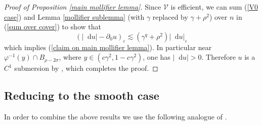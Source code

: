 \documentclass[reqno,11pt]{amsart}
\newcommand*\dif{\mathop{}\!\mathrm{d}}
\theoremstyle{definition}
\numberwithin{equation}{section}
\begin{document}
\begin{proof}[Proof of Proposition \ref{main mollifier lemma}]
Since $\mathcal V$ is efficient, we can sum (\ref{V0 case}) and Lemma \ref{mollifier sublemma} (with $\gamma$ replaced by $\gamma + \rho^2$) over $n$ in (\ref{sum over cover}) to show that
$$(|\dif u| - \partial_0 u)_\varepsilon \lesssim (\gamma^q + \rho^2) |\dif u|_\varepsilon$$
which implies (\ref{claim on main mollifier lemma}).
In particular near $\varphi^{-1}(y) \cap B_{\rho - 2\sigma}$, where $y \in (c\gamma^2, 1 - c\gamma^2)$, one has $|\dif u| > 0$.
Therefore $u$ is a $C^1$ submersion by \cite[Lemma 7.1]{Giusti77}, which completes the proof.
\end{proof}

\subsection{Reducing to the smooth case}
In order to combine the above results we use the following analogue of \cite[Lemma 7.5]{Giusti77}.
\end{document}
